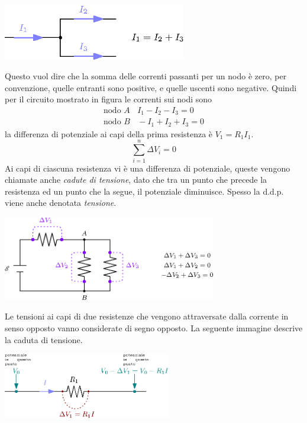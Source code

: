 \documentclass[10pt, letterpaper]{report}
\begin{document}
\begin{center}
    \includegraphics[width=0.6\textwidth]{images/Kirchhoff1.eps}
\end{center}
Questo vuol dire che la somma delle correnti passanti per un nodo è zero, per convenzione, quelle entranti sono positive, e quelle uscenti sono negative. Quindi per il circuito mostrato in figura le correnti sui nodi sono 
$$ \begin{matrix}
    \text{nodo }A \ \ \ \ I_1-I_2-I_3=0\\ 
    \text{nodo }B \ \ \ \ -I_1+I_2+I_3=0
\end{matrix}$$
la differenza di potenziale ai capi della prima resistenza è $V_1=R_1I_1$.
$$ \sum_{i=1}^n\Delta V_i=0$$
Ai capi di ciascuna resistenza vi è una differenza di potenziale, queste vengono chiamate anche \textit{cadute di tensione}, dato che tra un punto che precede la resistenza ed un punto che la segue, il potenziale diminuisce. Spesso la d.d.p. viene anche denotata \textit{tensione}.
\begin{center}
    \includegraphics[width=0.7\textwidth]{images/kirchoff2.eps}
\end{center}
Le tensioni ai capi di due resistenze che vengono attraversate dalla corrente in senso opposto vanno considerate di segno opposto. La seguente immagine descrive la caduta di tensione.
\begin{center}
    \includegraphics[width=0.55\textwidth]{images/cadutaDiTensione.eps}
\end{center}
\end{document}
